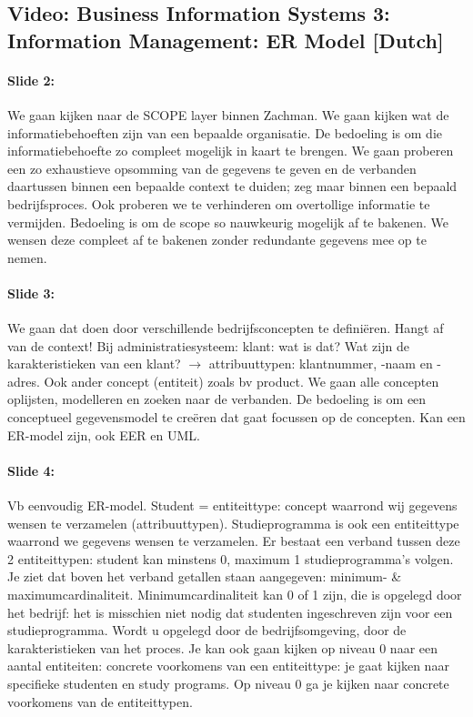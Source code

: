 \documentclass[10pt,a4paper]{report}
\begin{document}
\subsection{Video: Business Information Systems 3: Information Management: ER Model [Dutch]}

\paragraph{Slide 2:}We gaan kijken naar de SCOPE layer binnen Zachman. We gaan kijken wat de informatiebehoeften zijn van een bepaalde organisatie. De bedoeling is om die informatiebehoefte zo compleet mogelijk in kaart te brengen. We gaan proberen een zo exhaustieve opsomming van de gegevens te geven en de verbanden daartussen binnen een bepaalde context te duiden; zeg maar binnen een bepaald bedrijfsproces. Ook proberen we te verhinderen om overtollige informatie te vermijden. Bedoeling is om de scope so nauwkeurig mogelijk af te bakenen. We wensen deze compleet af te bakenen zonder redundante gegevens mee op te nemen. 

\paragraph{Slide 3:}We gaan dat doen door verschillende bedrijfsconcepten te definiëren. Hangt af van de context! Bij administratiesysteem: klant: wat is dat? Wat zijn de karakteristieken van een klant? $\rightarrow$ attribuuttypen: klantnummer, -naam en -adres. Ook ander concept (entiteit) zoals bv product.
We gaan alle concepten oplijsten, modelleren en zoeken naar de verbanden. De bedoeling is om een conceptueel gegevensmodel te creëren dat gaat focussen op de concepten. Kan een ER-model zijn, ook EER en UML.

\paragraph{Slide 4:}Vb eenvoudig ER-model. Student = entiteittype: concept waarrond wij gegevens wensen te verzamelen (attribuuttypen). Studieprogramma is ook een entiteittype waarrond we gegevens wensen te verzamelen. Er bestaat een verband tussen deze 2 entiteittypen: student kan minstens 0, maximum 1 studieprogramma's volgen. Je ziet dat boven het verband getallen staan aangegeven: minimum- \& maximumcardinaliteit. Minimumcardinaliteit kan 0 of 1 zijn, die is opgelegd door het bedrijf: het is misschien niet nodig dat studenten ingeschreven zijn voor een studieprogramma. Wordt u opgelegd door de bedrijfsomgeving, door de karakteristieken van het proces. Je kan ook gaan kijken op niveau 0 naar een aantal entiteiten: concrete voorkomens van een entiteittype: je gaat kijken naar specifieke studenten en study programs. Op niveau 0 ga je kijken naar concrete voorkomens van de entiteittypen.
\end{document}
